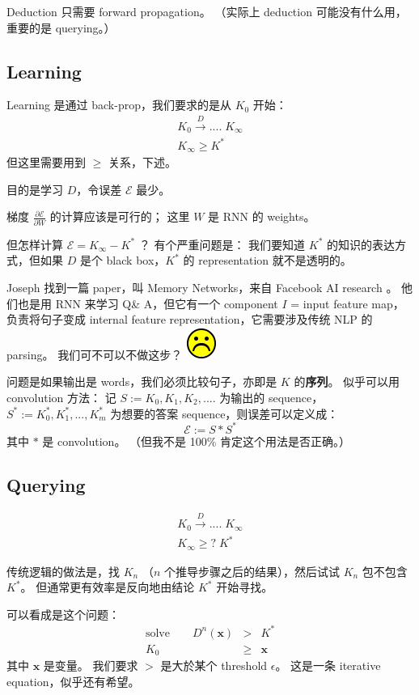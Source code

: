 \documentclass[12pt]{article}
\newcommand*\sadface{\includegraphics[scale=0.25]{face-sad.png}}
\begin{document}
Deduction 只需要 forward propagation。  （实际上 deduction 可能没有什么用，重要的是 querying。）

\subsection{Learning}

Learning 是通过 back-prop，我们要求的是从 $K_0$ 开始：
\begin{eqnarray}
K_0 \stackrel{D}{\longrightarrow} .... \; K_\infty \nonumber \\
K_\infty \ge K^*
\end{eqnarray}
但这里需要用到 $\ge$ 关系，下述。

目的是学习 $D$，令误差 $\mathcal{E}$ 最少。

梯度 $\frac{\partial \mathcal{E}}{\partial W}$ 的计算应该是可行的； 这里 $W$ 是 RNN 的 weights。

但怎样计算 $\mathcal{E} = K_\infty - K^*$ ？  有个严重问题是： 我们要知道 $K^*$ 的知识的表达方式，但如果 $D$ 是个 black box，$K^*$ 的 representation 就不是透明的。

Joseph 找到一篇 paper，叫 Memory Networks，来自 Facebook AI research \cite{Weston2015}。 他们也是用 RNN 来学习 Q\& A，但它有一个 component $I$ = input feature map，负责将句子变成 internal feature representation，它需要涉及传统 NLP 的 parsing。 我们可不可以不做这步？ \sadface

问题是如果输出是 words，我们必须比较句子，亦即是 $K$ 的\textbf{序列}。 似乎可以用 convolution 方法： 记 $S := K_0, K_1, K_2, ....$ 为输出的 sequence，$S^* := K^*_0, K^*_1, ..., K^*_m $ 为想要的答案 sequence，则误差可以定义成：
$$ \mathcal{E} := S * S^* $$
其中 $*$ 是 convolution。 （但我不是 100\% 肯定这个用法是否正确。）

\subsection{Querying}

\begin{eqnarray}
K_0 \stackrel{D}{\longrightarrow} .... \; K_\infty \nonumber \\
K_\infty \ge ? \; K^*
\end{eqnarray}

传统逻辑的做法是，找 $K_n$ （$n$ 个推导步骤之后的结果），然后试试 $K_n$ 包不包含 $K^*$。 但通常更有效率是反向地由结论 $K^*$ 开始寻找。

可以看成是这个问题：
\begin{eqnarray}
\mbox{solve}\quad\quad D^n(\mathbf{x}) & > & K^* \nonumber \\
K_0 & \ge & \mathbf{x}
\end{eqnarray}
其中 $\mathbf{x}$ 是变量。 我们要求 $>$ 是大於某个 threshold $\epsilon$。  这是一条 iterative equation，似乎还有希望。
\end{document}
